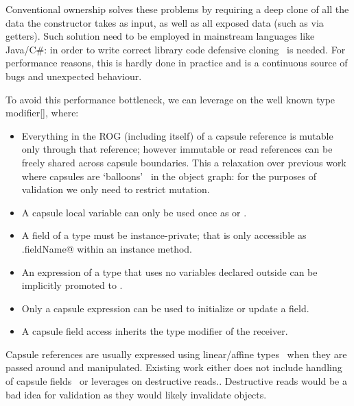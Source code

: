 Conventional ownership solves these problems by requiring a deep clone of all the data the constructor takes as input, as well as all exposed data (such as via getters).
Such solution need to be employed in mainstream languages like Java/C\#:
in order to write correct library code
defensive cloning~\cite{Bloch08} is needed.
For performance reasons, this is hardly done in practice and is a continuous source of bugs and unexpected behaviour.

To avoid this performance bottleneck, we can leverage on the well known \Q@capsule@ type modifier[], where:
\begin{itemize}
\item Everything in the ROG (including itself) of a capsule reference is mutable only through that reference; however immutable or read references can be freely shared across capsule boundaries. This a relaxation over previous work where capsules are `balloons'~\cite{Almeida97,ServettoEtAl13a} in the object graph: for the purposes of validation we only need to restrict mutation.
\item A capsule local variable can only be used once as \Q@capsule@ or \Q@mut@.
\item A field of a \Q@capsule@ type must be instance-private; that is only accessible as \Q@this.fieldName@ within an instance method.
\item An expression of a \Q@mut@ type that uses no \Q@mut@ variables declared outside can be implicitly promoted to \Q@capsule@.
\item Only a capsule expression can be used to initialize or update a \Q@capsule@ field.
\item A capsule field access inherits the type modifier of the receiver.
\end{itemize}

\noindent Capsule references are usually expressed using linear/affine types~\cite{Boyland01} when they are passed around and manipulated. Existing work either does not include handling of capsule fields~\cite{ServettoEtAl13a,ServettoZucca15} or leverages on destructive reads.\cite{GordonEtAl12,clebsch2015deny}.
Destructive reads would be a bad idea for validation as they would likely invalidate objects.

